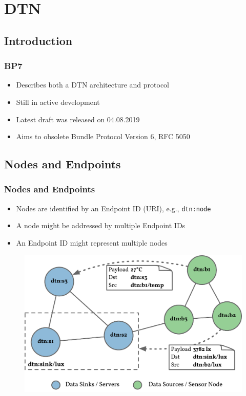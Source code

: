 \section{\acf{DTN}}

\subsection{Introduction}

\begin{frame}
  \frametitle{\acf{BP7}}

  \begin{itemize}
  \item Describes both a \acs{DTN} architecture and protocol
  \item Still in active development
  \item Latest draft was released on 04.08.2019
  \item Aims to obsolete Bundle Protocol Version 6, RFC 5050
  \end{itemize}
\end{frame}

\subsection{Nodes and Endpoints}

\begin{frame}
  \frametitle{Nodes and Endpoints}

  \begin{itemize}
  \item Nodes are identified by an Endpoint ID (URI), e.g., \texttt{dtn:node}
  \item A node might be addressed by multiple Endpoint IDs
  \item An Endpoint ID might represent multiple nodes
  \end{itemize}

  \begin{figure}
    \includegraphics[width=0.6\linewidth,keepaspectratio]{include/nodes-endpoints}
  \end{figure}
\end{frame}

